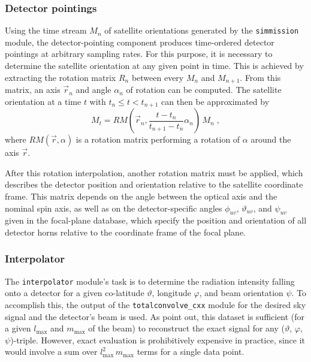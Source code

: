 \documentclass{aa}
\begin{document}
\subsubsection {Detector pointings}
\label{detpoint}

Using the time stream $M_n$ of satellite orientations generated by the
{\tt simmission} module, the detector-pointing component produces
time-ordered detector pointings at arbitrary sampling rates. For this
purpose, it is necessary to determine the satellite orientation at any
given point in time. This is achieved by extracting the rotation
matrix $R_n$ between every $M_n$ and $M_{n+1}$. From this matrix, an
axis $\vec r_n$ and angle $\alpha_n$ of rotation can be computed. The
satellite orientation at a time $t$ with $t_n\leq t<t_{n+1}$ can then
be approximated by
\begin{equation}
  M_t=RM\left(\vec r_n,\frac{t-t_n}{t_{n+1}-t_n}\alpha_n\right)\,M_n\;,
\end{equation}
where $RM(\vec r,\alpha)$ is a rotation matrix performing a rotation
of $\alpha$ around the axis $\vec r$.

After this rotation interpolation, another rotation matrix must be
applied, which describes the detector position and orientation relative to
the satellite coordinate frame.
This matrix depends on the angle between the optical axis and the nominal
spin axis, as well as on the detector-specific
angles $\phi_{uv}$, $\vartheta_{uv}$, and $\psi_{uv}$ given in the
focal-plane database,
which specify the position and orientation of all detector
horns relative to the coordinate frame of the focal plane.

\subsubsection {Interpolator}
\label{interpolator}

The {\tt interpolator} module's task is to determine the radiation
intensity falling onto a detector for a given co-latitude $\vartheta$,
longitude $\varphi$, and beam orientation $\psi$. To accomplish this,
the output of the {\tt totalconvolve\_cxx} module for the desired sky
signal and the detector's beam is used. As \cite{wandelt-gorski-2001}
point out, this dataset is sufficient (for a given $l_{\text{max}}$
and $m_{\text{max}}$ of the beam) to reconstruct the exact signal for
any ($\vartheta$, $\varphi$, $\psi$)-triple. However, exact evaluation
is prohibitively expensive in practice, since it would involve a sum
over $l_{\text{max}}^2\,m_{\text{max}}$ terms for a single data point.
\end{document}
